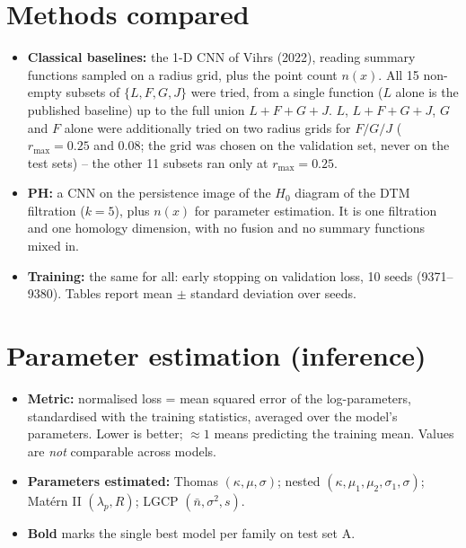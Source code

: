 \documentclass[10pt,a4paper]{article}
\newcommand{\nbar}{\bar n}
\begin{document}
\section{Methods compared}

\begin{itemize}
  \item \textbf{Classical baselines:} the 1-D CNN of Vihrs (2022), reading summary functions sampled on a radius grid, plus the point count $n(x)$. All 15 non-empty subsets of $\{L,F,G,J\}$ were tried, from a single function ($L$ alone is the published baseline) up to the full union $L{+}F{+}G{+}J$. $L$, $L{+}F{+}G{+}J$, $G$ and $F$ alone were additionally tried on two radius grids for $F/G/J$ ($r_{\max}=0.25$ and $0.08$; the grid was chosen on the validation set, never on the test sets) -- the other 11 subsets ran only at $r_{\max}=0.25$.
  \item \textbf{PH:} a CNN on the persistence image of the $H_0$ diagram of the DTM filtration ($k=5$), plus $n(x)$ for parameter estimation. It is one filtration and one homology dimension, with no fusion and no summary functions mixed in.
  \item \textbf{Training:} the same for all: early stopping on validation loss, 10 seeds (9371--9380). Tables report mean $\pm$ standard deviation over seeds.
\end{itemize}

\section{Parameter estimation (inference)}

\begin{itemize}
  \item \textbf{Metric:} normalised loss = mean squared error of the log-parameters, standardised with the training statistics, averaged over the model's parameters. Lower is better; $\approx 1$ means predicting the training mean. Values are \emph{not} comparable across models.
  \item \textbf{Parameters estimated:} Thomas $(\kappa,\mu,\sigma)$; nested $(\kappa,\mu_1,\mu_2,\sigma_1,\sigma)$; Mat\'ern II $(\lambda_p,R)$; LGCP $(\nbar,\sigma^2,s)$.
  \item \textbf{Bold} marks the single best model per family on test set A.
\end{itemize}
\end{document}
